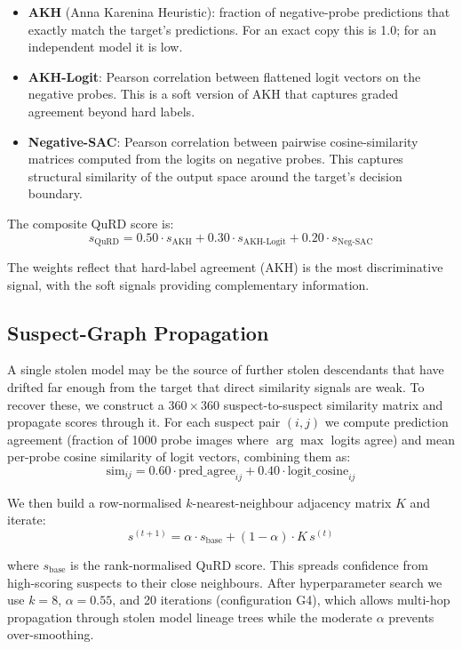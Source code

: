 \documentclass{article} %
\begin{document}
\begin{itemize}
    \item \textbf{AKH} (Anna Karenina Heuristic): fraction of negative-probe predictions that exactly match the target's predictions. For an exact copy this is 1.0; for an independent model it is low.
    \item \textbf{AKH-Logit}: Pearson correlation between flattened logit vectors on the negative probes. This is a soft version of AKH that captures graded agreement beyond hard labels.
    \item \textbf{Negative-SAC}: Pearson correlation between pairwise cosine-similarity matrices computed from the logits on negative probes. This captures structural similarity of the output space around the target's decision boundary.
\end{itemize}

The composite QuRD score is:
\[
s_{\text{QuRD}} = 0.50 \cdot s_{\text{AKH}} + 0.30 \cdot s_{\text{AKH-Logit}} + 0.20 \cdot s_{\text{Neg-SAC}}
\]

The weights reflect that hard-label agreement (AKH) is the most discriminative signal, with the soft signals providing complementary information.

\subsection{Suspect-Graph Propagation}

A single stolen model may be the source of further stolen descendants that have drifted far enough from the target that direct similarity signals are weak. To recover these, we construct a $360 \times 360$ suspect-to-suspect similarity matrix and propagate scores through it. For each suspect pair $(i, j)$ we compute prediction agreement (fraction of 1000 probe images where $\arg\max$ logits agree) and mean per-probe cosine similarity of logit vectors, combining them as:
\[
\text{sim}_{ij} = 0.60 \cdot \text{pred\_agree}_{ij} + 0.40 \cdot \text{logit\_cosine}_{ij}
\]

We then build a row-normalised $k$-nearest-neighbour adjacency matrix $K$ and iterate:
\[
s^{(t+1)} = \alpha \cdot s_{\text{base}} + (1 - \alpha) \cdot K \, s^{(t)}
\]

where $s_{\text{base}}$ is the rank-normalised QuRD score. This spreads confidence from high-scoring suspects to their close neighbours. After hyperparameter search we use $k{=}8$, $\alpha{=}0.55$, and 20 iterations (configuration G4), which allows multi-hop propagation through stolen model lineage trees while the moderate $\alpha$ prevents over-smoothing.
\end{document}

